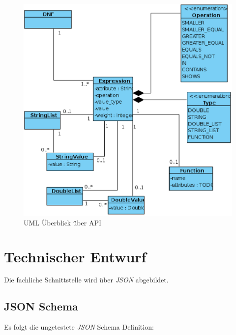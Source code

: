 \documentclass[a4paper,10pt,parskip=half]{scrartcl}
\begin{document}
\begin{figure}[htb]
 \includegraphics[width=12cm]{overview}
 \caption{UML Überblick über API}
 \label{fig:overview}
\end{figure}


\section{Technischer Entwurf}

Die fachliche Schnittstelle wird über \textit{JSON} abgebildet.

\subsection{JSON Schema}

Es folgt die \color{red}ungetestete \color{black} \textit{JSON} Schema 
Definition:
\end{document}
